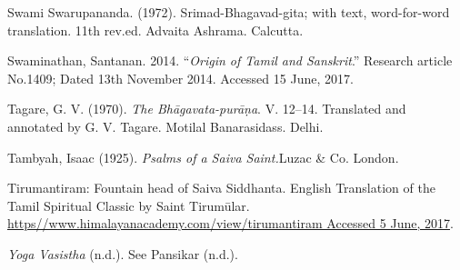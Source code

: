 \begin{thebibliography}{99}
  Swami Swarupananda. (1972). Srimad-Bhagavad-gita; with text, word-for-word translation. 11th rev.ed. Advaita Ashrama. Calcutta.

  Swaminathan, Santanan. 2014. “\textit{Origin of Tamil and Sanskrit}.” Research article No.1409; Dated 13th November 2014. Accessed 15 June, 2017.

  Tagare, G. V. (1970). \textit{The Bhāgavata-purāṇa}. V. 12–14. Translated and annotated by G. V. Tagare. Motilal Banarasidass. Delhi.

  Tambyah, Isaac (1925). \textit{Psalms of a Saiva Saint.}Luzac \& Co. London.

  Tirumantiram: Fountain head of Saiva Siddhanta. English Translation of the Tamil Spiritual Classic by Saint Tirumūlar. \url{https//www.himalayanacademy.com/view/tirumantiram Accessed 5 June, 2017}.

  \textit{Yoga Vasistha} (n.d.). See Pansikar (n.d.).

 \end{thebibliography}

\theendnotes

